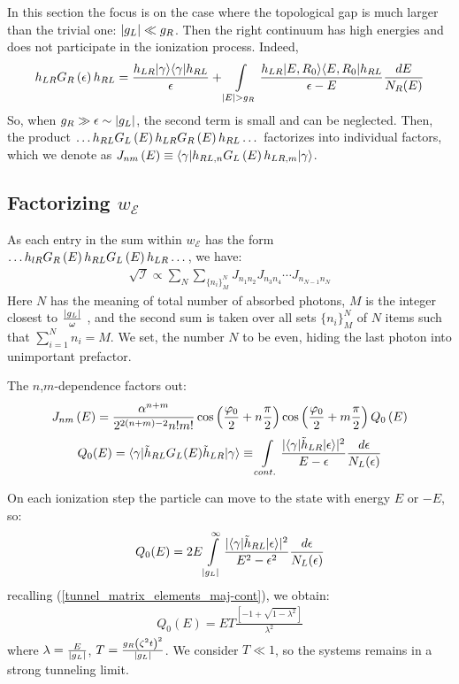 In this section the focus is on the case where the topological gap is much larger than the trivial one: $ \left|g_L\right|\ll g_R $. Then the right continuum has high energies and does not participate in the ionization process. Indeed,
\begin{gather}
	h_{LR} G_R\br{\epsilon} h_{RL}
	=
	\frac{h_{LR}|\gamma\rangle\langle\gamma|h_{RL}}{\epsilon}
	+
	\intop_{|E|>g_{R}}
	\frac{h_{LR}|E,R_0\rangle\langle E,R_0|h_{RL}}{\epsilon-E}\frac{dE}{N_{R}(E)}
\end{gather}
So, when $ g_{R}\gg\epsilon\sim \left|g_L\right| $, the second term is small and can be neglected. Then, the product $ \dots h_{RL}G_L\left(E\right)h_{LR}G_R\left(E\right)h_{RL}\dots $ factorizes into individual factors, which we denote as $ J_{nm}\left(E\right)\equiv\langle\gamma|h_{RL,n}G_L\left(E\right)h_{LR,m}|\gamma\rangle $.

\subsection{Factorizing $ w_\mathcal{E} $}
\label{sect:factorizeing_w}

As each entry in the sum within $ w_{\mathcal{E}} $ has the form $ \dots h_{lR}G_R\left(E\right)h_{RL}G_L\left(E\right)h_{LR}\dots $, we have:
\begin{gather}
	\sqrt{\mathcal{I}}\propto
	\sum_N \sum_{\{n_i\}_M^N}
	J_{n_1 n_{2}}
	J_{n_3 n_{4}}
	\cdots
	J_{n_{N-1}n_{N}}
\end{gather}
Here $ N $ has the meaning of total number of absorbed photons, $ M $ is the integer closest to $ \frac{\left|g_L\right|}{\omega }$ , and the second sum is taken over all sets $ \{n_i\}_M^N $ of $ N $ items such that $ \sum_{i=1}^N n_{i} = M$. We set, the number $ N $ to be even, hiding the last photon into unimportant prefactor.

 The $ n $,$ m $-dependence factors out:
\begin{gather}
J_{nm}\left(E\right)
=
	\frac{\alpha^{n+m}}
	{2^{2\left(n+m\right)-2}n!m!}
	\cos\left(\frac{\varphi_{0}}{2}+n\frac{\pi}{2}\right)
	\cos\left(\frac{\varphi_{0}}{2}+m\frac{\pi}{2}\right)
	Q_0\left(E\right)
\end{gather}
\begin{gather}
	Q_{0}(E)
	=
	\langle\gamma|\tilde{h}_{RL}G_L(E)\tilde{h}_{LR}|\gamma\rangle
	\equiv
	\intop_{cont.}\frac{|\langle\gamma|\tilde{h}_{LR}|\epsilon\rangle|^{2}}{E-\epsilon}\frac{d\epsilon}{N_L(\epsilon)}
\end{gather}

On each ionization step  the particle can move to the state with energy $ E $ or $ -E $, so:
\begin{gather}
	Q_{0}(E)
	=
	2E\intop_{|g_{L}|}^{\infty}\frac{|\langle\gamma|\tilde{h}_{RL}|\epsilon\rangle|^{2}}{E^{2}-\epsilon^{2}}\frac{d\epsilon}{N_L(\epsilon)}
\end{gather}
recalling (\ref{tunnel_matrix_elements_maj-cont}), we obtain:
\begin{gather}
\label{ionization_brick}
		Q_{0}(E)
		=
		ET\frac{\left[-1+\sqrt{1-\lambda^{2}}\right]}{\lambda^{2}}
\end{gather}
where $ \lambda = \frac{E}{\left|g_L\right|} $, $ T=\frac{g_R\left(\zeta^2t\right)^2}{\left|g_L\right|} $. We consider $ T\ll 1$, so the systems remains in a strong tunneling limit.

